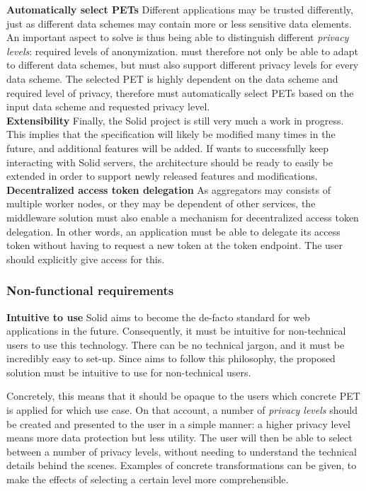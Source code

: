 \noindent \textbf{Automatically select \gls{PETs}} Different applications may be trusted differently, just as different data schemes may contain more or less sensitive data elements. An important aspect to solve is thus being able to distinguish different \textit{privacy levels}: required levels of anonymization. \middleware{} must therefore not only be able to adapt to different data schemes, but must also support different privacy levels for every data scheme. The selected PET is highly dependent on the data scheme and required level of privacy, therefore \middleware{} must automatically select \gls{PETs} based on the input data scheme and requested privacy level. \\

\noindent \textbf{Extensibility} Finally, the Solid project is still very much a work in progress. This implies that the specification will likely be modified many times in the future, and additional features will be added. If \middleware{} wants to successfully keep interacting with Solid servers, the architecture should be ready to easily be extended in order to support newly released features and modifications. \\

\noindent \textbf{Decentralized access token delegation} As aggregators may consists of multiple worker nodes, or they may be dependent of other services, the middleware solution must also enable a mechanism for decentralized access token delegation. In other words, an application must be able to delegate its access token without having to request a new token at the token endpoint. The user should explicitly give access for this.

\subsubsection{Non-functional requirements}
\textbf{Intuitive to use} Solid aims to become the de-facto standard for web applications in the future. Consequently, it must be intuitive for non-technical users to use this technology. There can be no technical jargon, and it must be incredibly easy to set-up. Since \middleware{} aims to follow this philosophy, the proposed solution must be intuitive to use for non-technical users. 

Concretely, this means that it should be opaque to the users which concrete PET is applied for which use case. On that account, a number of \textit{privacy levels} should be created and presented to the user in a simple manner: a higher privacy level means more data protection but less utility. The user will then be able to select between a number of privacy levels, without needing to understand the technical details behind the scenes. Examples of concrete transformations can be given, to make the effects of selecting a certain level more comprehensible. \\

